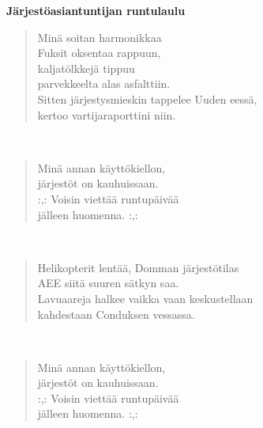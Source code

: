 \noindent\begin{minipage}{\linewidth}
\vspace{5pt}
\parbox[t]{0.85\linewidth}{\raggedright {\large\bf Järjestöasiantuntijan runtulaulu}\\[6pt]}
\begin{verse}
	Minä soitan harmonikkaa\\
	Fuksit oksentaa rappuun,\\
	kaljatölkkejä tippuu\\
	parvekkeelta alas asfalttiin.\\
	Sitten järjestysmieskin tappelee Uuden eessä,\\
	kertoo vartijaraporttini niin.\\
\end{verse}
\end{minipage}\\[10pt]
\noindent\begin{minipage}{\linewidth}
\begin{verse}
	Minä annan käyttökiellon,\\
	järjestöt on kauhuissaan.\\
	\hspace{0pt-\widthof{:,: }}:,: Voisin viettää runtupäivää\\
	jälleen huomenna. :,:\\
\end{verse}
\end{minipage}\\[10pt]
\noindent\begin{minipage}{\linewidth}
\begin{verse}
	Helikopterit lentää, Domman järjestötilas\\
	AEE siitä suuren sätkyn saa.\\
	Lavuaareja halkee vaikka vaan keskustellaan\\
	kahdestaan Conduksen vessassa.\\
\end{verse}
\end{minipage}\\[10pt]
\noindent\begin{minipage}{\linewidth}
\begin{verse}
	Minä annan käyttökiellon,\\
	järjestöt on kauhuissaan.\\
	\hspace{0pt-\widthof{:,: }}:,: Voisin viettää runtupäivää\\
	jälleen huomenna. :,:\\
\end{verse}
\end{minipage}\\[10pt]
